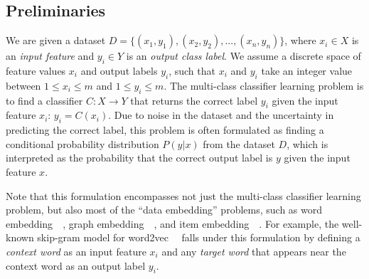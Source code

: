 \subsection{Preliminaries}
We are given a dataset $D = \{(x_1, y_1),$$(x_2, y_2),$$..., (x_n, y_n)\}$, where $x_i \in X$ is an \emph{input feature} and $y_i \in Y$ is an \emph{output class label}. We assume a discrete space of feature values $x_i$ and output labels $y_i$, such that $x_i$ and $y_i$ take an integer value between $1 \le x_i \le m$ and $1 \le y_i \le m$. The multi-class classifier learning problem is to find a classifier $C: X \rightarrow Y$ that returns the correct label $y_i$ given the input feature $x_i$: $y_i = C(x_i)$. Due to noise in the dataset and the uncertainty in predicting the correct label, this problem is often formulated as finding a conditional probability distribution $P(y|x)$ from the dataset $D$, which is interpreted as the probability that the correct output label is $y$ given the input feature $x$.

Note that this formulation encompasses not just the multi-class classifier learning problem, but also most of the ``data embedding'' problems, such as word embedding~~\citep{mikolov2013efficient,mikolov2013distributed}, graph embedding~~\citep{grover2016node2vec}, and item embedding~~\citep{barkan2016item2vec}. For example, the well-known skip-gram model for word2vec~~\citep{mikolov2013distributed} falls under this formulation by defining a \emph{context word} as an  input feature $x_i$ and any \emph{target word} that appears near the context word as an output label $y_i$.

